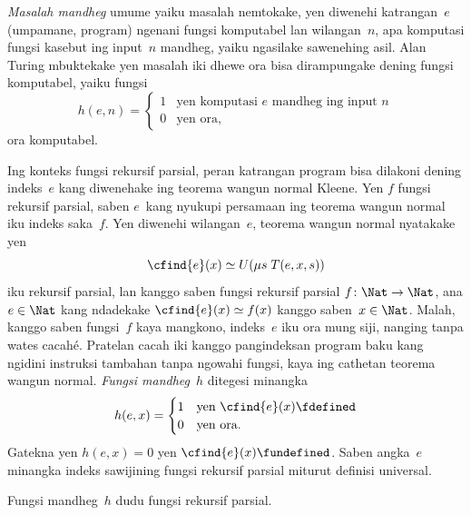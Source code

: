 \documentclass[../../../include/open-logic-section]{subfiles}
\begin{document}

\emph{Masalah mandheg} umume yaiku masalah nemtokake,
yen diwenehi katrangan~$e$ (umpamane, program) ngenani fungsi
komputabel lan wilangan~$n$, apa komputasi fungsi kasebut
ing input~$n$ mandheg, yaiku ngasilake sawenehing asil.
Alan Turing mbuktekake yen masalah iki dhewe ora bisa
dirampungake dening fungsi komputabel, yaiku fungsi
\[
h(e, n) =
\begin{cases}
1 & \text{yen komputasi $e$ mandheg ing input $n$}\\
0 & \text{yen ora,}
\end{cases}
\]
ora komputabel.

Ing konteks fungsi rekursif parsial, peran
katrangan program bisa dilakoni dening indeks~$e$
kang diwenehake ing teorema wangun normal Kleene.
Yen $f$ fungsi rekursif parsial, saben $e$~kang
nyukupi persamaan ing teorema wangun normal iku
indeks saka~$f$. Yen diwenehi wilangan~$e$,
teorema wangun normal nyatakake yen
\[
\cfind{e}(x) \simeq U(\mu s \; T(e, x, s))
\]
iku rekursif parsial, lan kanggo saben fungsi
rekursif parsial $f\colon \Nat
\to \Nat$, ana $e \in \Nat$ kang ndadekake
$\cfind{e}(x) \simeq f(x)$ kanggo saben~$x \in \Nat$.
Malah, kanggo saben fungsi~$f$ kaya mangkono,
indeks~$e$ iku ora mung siji, nanging tanpa wates cacahé. Pratelan cacah iki kanggo pangindeksan program baku kang ngidini instruksi tambahan tanpa ngowahi fungsi, kaya ing cathetan teorema wangun normal.
\emph{Fungsi mandheg}~$h$ ditegesi minangka
\[
h(e, x) =
\begin{cases}
1 & \text{yen $\cfind{e}(x) \fdefined$}\\
0 & \text{yen ora.}
\end{cases}
\]
Gatekna yen $h(e, x) = 0$ yen $\cfind{e}(x) \fundefined$.
Saben angka~$e$ minangka indeks sawijining fungsi rekursif parsial miturut definisi universal.

\begin{thm}
Fungsi mandheg~$h$ dudu fungsi rekursif parsial.
\end{thm}
\end{document}
